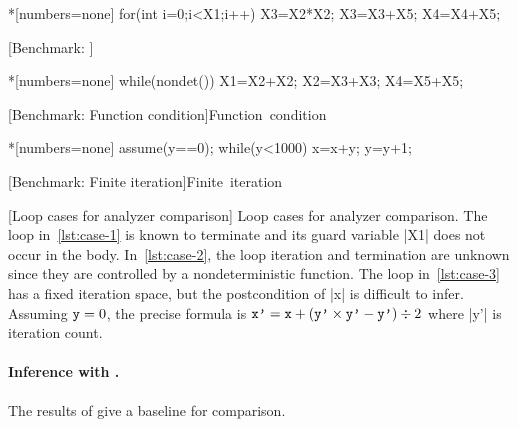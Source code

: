 \begin{center}
\captionsetup{type=figure}
\begin{minipage}{\textwidth}
\begin{minipage}[t]{.33\textwidth}
\begin{implisting}*[numbers=none]
for(int i=0;i<X1;i++)
{ X3=X2*X2;
  X3=X3+X5;
  X4=X4+X5; }
\end{implisting}
[Benchmark: \explain]{\mbox{\explain}}
\label{lst:case-1}
\end{minipage}\hfill%
\begin{minipage}[t]{.33\textwidth}
\begin{implisting}*[numbers=none]
while(nondet())
{ X1=X2+X2;
  X2=X3+X3;
  X4=X5+X5; }
\end{implisting}
[Benchmark: Function condition]{\mbox{Function condition}}
\label{lst:case-2}
\end{minipage}\hfill%
\begin{minipage}[t]{.3\textwidth}
\begin{implisting}*[numbers=none]
assume(y==0);
while(y<1000)
{ x=x+y;
  y=y+1; }
\end{implisting}
[Benchmark: Finite iteration]{\mbox{Finite iteration}}
\label{lst:case-3}
\end{minipage}
\end{minipage}
[Loop cases for analyzer comparison]{
Loop cases for analyzer comparison.
The loop in~\ref{lst:case-1} is known to terminate and its guard variable \pr|X1| does not occur in the body.
In~\ref{lst:case-2}, the loop iteration and termination are unknown since they are controlled by a nondeterministic function.
The loop in~\ref{lst:case-3} has a fixed iteration space, but the postcondition of \pr|x| is difficult to infer.
Assuming \(\prm{y}=0\), the precise formula is \(\prm{x'} = \prm{x} + (\prm{y'} \times \prm{y'} - \prm{y'}) \div 2\) where \pr|y'| is iteration count.}
\label{fig:loops}
\end{center}

\paragraph{Inference with \impl.}
The results of \impl give a baseline for comparison.

